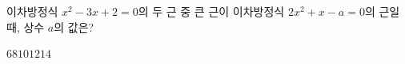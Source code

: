 이차방정식 $x^2-3x+2=0$의 두 근 중 큰 근이 이차방정식 $2x^2+x-a=0$의 근일 때, 상수 $a$의 값은?
\begin{choices32}{$6$}{$8$}{$10$}{$12$}{$14$}\end{choices32}
